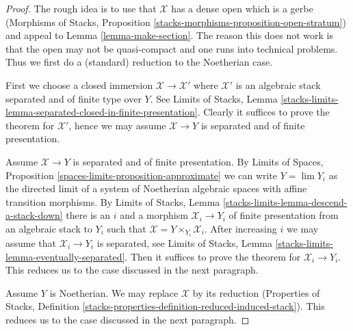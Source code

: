 \documentclass[10pt,a4paper]{amsart}
\theoremstyle{plain}
\theoremstyle{definition}
\theoremstyle{remark}
\numberwithin{equation}{subsection}
\def\lim{\mathop{\mathrm{lim}}\nolimits}
\begin{document}
\begin{proof}
The rough idea is to use that $\mathcal{X}$ has a dense open
which is a gerbe (Morphisms of Stacks, Proposition
\ref{stacks-morphisms-proposition-open-stratum})
and appeal to Lemma \ref{lemma-make-section}.
The reason this does not work is that the open may not be
quasi-compact and one runs into technical problems. Thus
we first do a (standard) reduction to the Noetherian case.

\medskip\noindent
First we choose a closed immersion
$\mathcal{X} \to \mathcal{X}'$ where $\mathcal{X}'$
is an algebraic stack separated and of finite type over $Y$.
See Limits of Stacks, Lemma
\ref{stacks-limits-lemma-separated-closed-in-finite-presentation}.
Clearly it suffices to prove the theorem for
$\mathcal{X}'$, hence we may assume $\mathcal{X} \to Y$
is separated and of finite presentation.

\medskip\noindent
Assume $\mathcal{X} \to Y$ is separated and of finite presentation.
By Limits of Spaces, Proposition \ref{spaces-limits-proposition-approximate}
we can write $Y = \lim Y_i$ as the directed limit of a system
of Noetherian algebraic spaces with affine transition morphisms.
By Limits of Stacks, Lemma \ref{stacks-limits-lemma-descend-a-stack-down}
there is an $i$ and a morphism $\mathcal{X}_i \to Y_i$ of finite presentation
from an algebraic stack to $Y_i$ such that
$\mathcal{X} = Y \times_{Y_i} \mathcal{X}_i$.
After increasing $i$ we may assume that $\mathcal{X}_i \to Y_i$
is separated, see Limits of Stacks, Lemma
\ref{stacks-limits-lemma-eventually-separated}.
Then it suffices to prove the theorem
for $\mathcal{X}_i \to Y_i$. This reduces us to the case discussed
in the next paragraph.

\medskip\noindent
Assume $Y$ is Noetherian. We may replace $\mathcal{X}$ by its
reduction (Properties of Stacks, Definition
\ref{stacks-properties-definition-reduced-induced-stack}).
This reduces us to the case discussed
in the next paragraph.


\end{proof}
\end{document}
